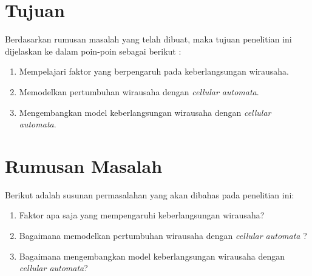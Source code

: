 \documentclass[a4paper,twoside]{article}
\begin{document}
\section{Tujuan}

Berdasarkan rumusan masalah yang telah dibuat, maka tujuan penelitian ini dijelaskan ke dalam poin-poin sebagai berikut :


\begin{enumerate}
	\item Mempelajari faktor yang berpengaruh pada keberlangsungan wirausaha.
	\item Memodelkan pertumbuhan wirausaha dengan \textit{cellular automata}.
	\item Mengembangkan model keberlangsungan wirausaha dengan \textit{cellular automata}.
\end{enumerate}

\section{Rumusan Masalah}

Berikut adalah susunan permasalahan yang akan dibahas pada penelitian ini:


\begin{enumerate}
	\item Faktor apa saja yang mempengaruhi keberlangsungan wirausaha?
	\item Bagaimana memodelkan pertumbuhan wirausaha dengan \textit{cellular automata} ?
	\item Bagaimana mengembangkan model keberlangsungan wirausaha dengan \textit{cellular automata}?
\end{enumerate}
\end{document}
